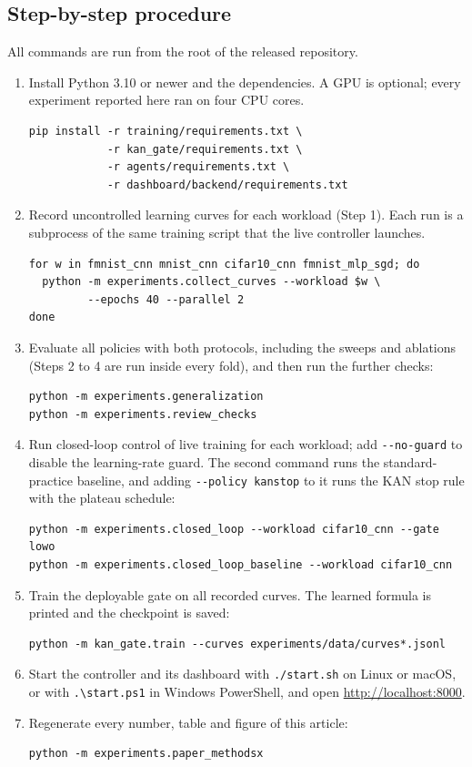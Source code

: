 \subsection*{Step-by-step procedure}
All commands are run from the root of the released repository.
\begin{enumerate}
\item Install Python 3.10 or newer and the dependencies. A GPU is optional; every experiment reported here ran on four CPU cores.
{\footnotesize
\begin{verbatim}
pip install -r training/requirements.txt \
            -r kan_gate/requirements.txt \
            -r agents/requirements.txt \
            -r dashboard/backend/requirements.txt
\end{verbatim}}
\item Record uncontrolled learning curves for each workload (Step 1). Each run is a subprocess of the same training script that the live controller launches.
{\footnotesize
\begin{verbatim}
for w in fmnist_cnn mnist_cnn cifar10_cnn fmnist_mlp_sgd; do
  python -m experiments.collect_curves --workload $w \
         --epochs 40 --parallel 2
done
\end{verbatim}}
\item Evaluate all policies with both protocols, including the sweeps and ablations (Steps 2 to 4 are run inside every fold), and then run the further checks:
{\footnotesize
\begin{verbatim}
python -m experiments.generalization
python -m experiments.review_checks
\end{verbatim}}
\item Run closed-loop control of live training for each workload; add \texttt{-{}-no-guard} to disable the learning-rate guard. The second command runs the standard-practice baseline, and adding \texttt{-{}-policy kanstop} to it runs the KAN stop rule with the plateau schedule:
{\footnotesize
\begin{verbatim}
python -m experiments.closed_loop --workload cifar10_cnn --gate lowo
python -m experiments.closed_loop_baseline --workload cifar10_cnn
\end{verbatim}}
\item Train the deployable gate on all recorded curves. The learned formula is printed and the checkpoint is saved:
{\footnotesize
\begin{verbatim}
python -m kan_gate.train --curves experiments/data/curves*.jsonl
\end{verbatim}}
\item Start the controller and its dashboard with \texttt{./start.sh} on Linux or macOS, or with \texttt{.\textbackslash start.ps1} in Windows PowerShell, and open \url{http://localhost:8000}.
\item Regenerate every number, table and figure of this article:
{\footnotesize
\begin{verbatim}
python -m experiments.paper_methodsx
\end{verbatim}}
\end{enumerate}
